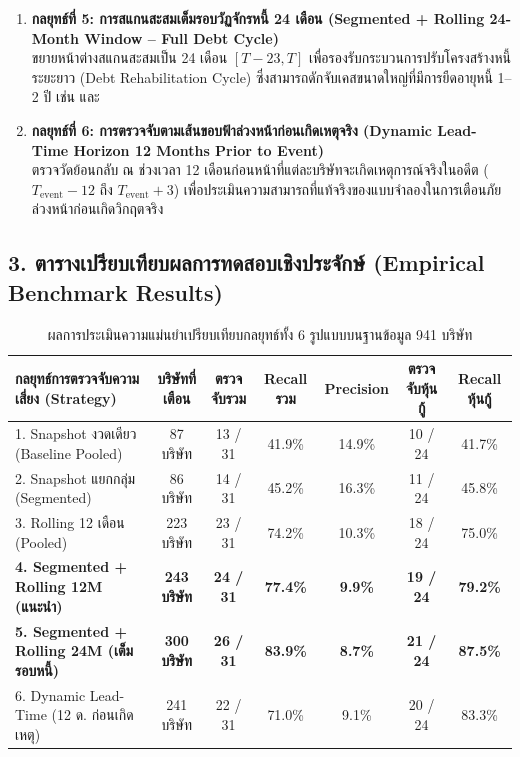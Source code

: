 \documentclass[11pt,a4paper]{article}
\newcommand{\ft}[1]{\texttt{\detokenize{#1}}}
\begin{document}
\begin{enumerate}[leftmargin=1.5em]
  \item \textbf{กลยุทธ์ที่ 5: การสแกนสะสมเต็มรอบวัฏจักรหนี้ 24 เดือน (Segmented + Rolling 24-Month Window -- Full Debt Cycle)} \\
  ขยายหน้าต่างสแกนสะสมเป็น 24 เดือน $[T-23, T]$ เพื่อรองรับกระบวนการปรับโครงสร้างหนี้ระยะยาว (Debt Rehabilitation Cycle) ซึ่งสามารถดักจับเคสขนาดใหญ่ที่มีการยืดอายุหนี้ 1--2 ปี เช่น \ft{EA} และ \ft{RICHY}
  
  \item \textbf{กลยุทธ์ที่ 6: การตรวจจับตามเส้นขอบฟ้าล่วงหน้าก่อนเกิดเหตุจริง (Dynamic Lead-Time Horizon 12 Months Prior to Event)} \\
  ตรวจวัดย้อนกลับ ณ ช่วงเวลา 12 เดือนก่อนหน้าที่แต่ละบริษัทจะเกิดเหตุการณ์จริงในอดีต ($T_{\text{event}} - 12$ ถึง $T_{\text{event}} + 3$) เพื่อประเมินความสามารถที่แท้จริงของแบบจำลองในการเตือนภัยล่วงหน้าก่อนเกิดวิกฤตจริง
\end{enumerate}

\subsection{3. ตารางเปรียบเทียบผลการทดสอบเชิงประจักษ์ (Empirical Benchmark Results)}

\begin{table}[H]
\centering
\small
\renewcommand{\arraystretch}{1.25}
\begin{tabular}{lcccccc}
\toprule
\textbf{กลยุทธ์การตรวจจับความเสี่ยง (Strategy)} & \textbf{บริษัทที่เตือน} & \textbf{ตรวจจับรวม} & \textbf{Recall รวม} & \textbf{Precision} & \textbf{ตรวจจับหุ้นกู้} & \textbf{Recall หุ้นกู้} \\
\midrule
1. Snapshot งวดเดียว (Baseline Pooled) & 87 บริษัท & 13 / 31 & 41.9\% & 14.9\% & 10 / 24 & 41.7\% \\
2. Snapshot แยกกลุ่ม (Segmented) & 86 บริษัท & 14 / 31 & 45.2\% & 16.3\% & 11 / 24 & 45.8\% \\
3. Rolling 12 เดือน (Pooled) & 223 บริษัท & 23 / 31 & 74.2\% & 10.3\% & 18 / 24 & 75.0\% \\
\rowcolor{softgrey} \textbf{4. Segmented + Rolling 12M (แนะนำ)} & \textbf{243 บริษัท} & \textbf{24 / 31} & \textbf{77.4\%} & \textbf{9.9\%} & \textbf{19 / 24} & \textbf{79.2\%} \\
\rowcolor{softgrey} \textbf{5. Segmented + Rolling 24M (เต็มรอบหนี้)} & \textbf{300 บริษัท} & \textbf{26 / 31} & \textbf{83.9\%} & \textbf{8.7\%} & \textbf{21 / 24} & \textbf{87.5\%} \\
6. Dynamic Lead-Time (12 ด. ก่อนเกิดเหตุ) & 241 บริษัท & 22 / 31 & 71.0\% & 9.1\% & 20 / 24 & 83.3\% \\
\bottomrule
\end{tabular}
\caption{ผลการประเมินความแม่นยำเปรียบเทียบกลยุทธ์ทั้ง 6 รูปแบบบนฐานข้อมูล 941 บริษัท}
\label{tab:six_strategies_comp}
\end{table}
\end{document}
